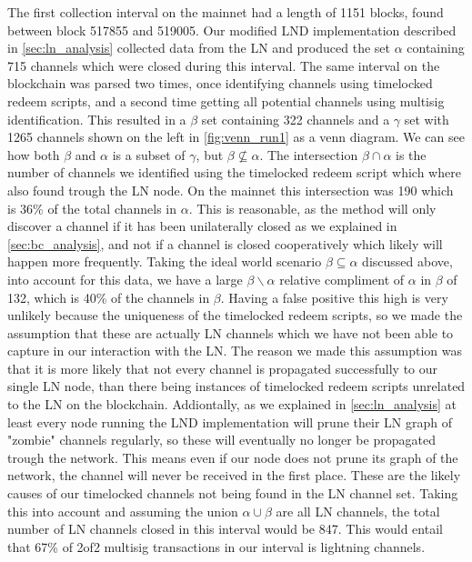 The first collection interval on the mainnet had a length of 1151 blocks, found between block 517855 and 519005. Our modified LND implementation described in \cref{sec:ln_analysis} collected data from the LN and produced the set $\alpha$ containing 715 channels which were closed during this interval. The same interval on the blockchain was parsed two times, once identifying channels using timelocked redeem scripts, and a second time getting all potential channels using multisig identification. This resulted in a $\beta$ set containing 322 channels and a $\gamma$ set with 1265 channels shown on the left in \cref{fig:venn_run1} as a venn diagram. We can see how both $\beta$ and $\alpha$ is a subset of $\gamma$, but $\beta \not\subseteq \alpha$. The intersection $\beta \cap \alpha$ is the number of channels we identified using the timelocked redeem script which where also found trough the LN node. On the mainnet this intersection was 190 which is 36\% of the total channels in $\alpha$. This is reasonable, as the method will only discover a channel if it has been unilaterally closed as we explained in \cref{sec:bc_analysis}, and not if a channel is closed cooperatively which likely will happen more frequently. Taking the ideal world scenario $\beta \subseteq \alpha$ discussed above, into account for this data, we have a large $\beta \backslash{} \alpha$ relative compliment of $\alpha$ in $\beta$ of 132, which is 40\% of the channels in $\beta$. Having a false positive this high is very unlikely because the uniqueness of the timelocked redeem scripts, so we made the assumption that these are actually LN channels which we have not been able to capture in our interaction with the LN. The reason we made this assumption was that it is more likely that not every channel is propagated successfully to our single LN node, than there being instances of timelocked redeem scripts unrelated to the LN on the blockchain. Addiontally, as we explained in \cref{sec:ln_analysis} at least every node running the LND implementation will prune their LN graph of "zombie" channels regularly, so these will eventually no longer be propagated trough the network. This means even if our node does not prune its graph of the network, the channel will never be received in the first place. These are the likely causes of our timelocked channels not being found in the LN channel set.
Taking this into account and assuming the union $\alpha \cup \beta$ are all LN channels, the total number of LN channels closed in this interval would be 847. This would entail that 67\% of 2of2 multisig transactions in our interval is lightning channels. 
\\


